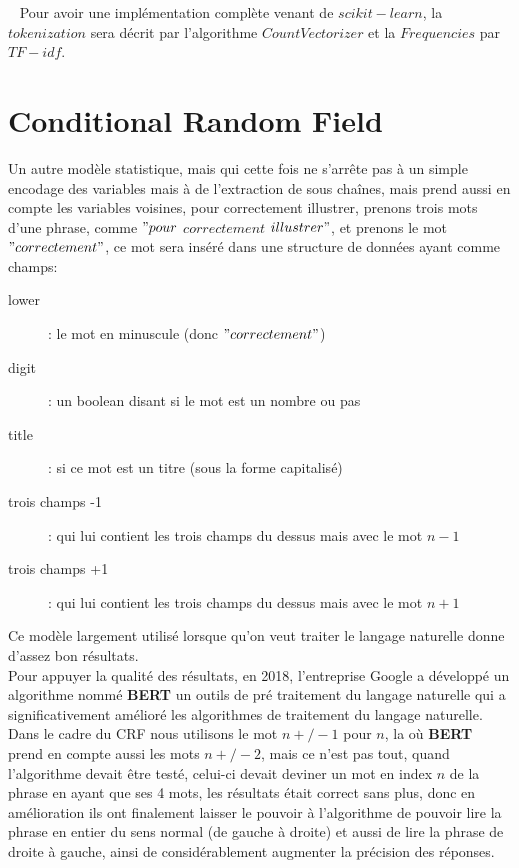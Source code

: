 \ \linebreak
Pour avoir une implémentation complète venant de $scikit-learn$, la $tokenization$ sera décrit par l'algorithme $CountVectorizer$ et la $Frequencies$ par $TF-idf$.\\
\pagebreak

\section{Conditional Random Field}
Un autre modèle statistique, mais qui cette fois ne s'arrête pas à un simple encodage des variables mais à de l'extraction de sous chaînes, mais prend aussi en compte les variables voisines, pour correctement illustrer, prenons trois mots d'une phrase, comme $"pour$ $correctement$ $illustrer"$, et prenons le mot $"correctement"$, ce mot sera inséré dans une structure de données ayant comme champs:
\begin{description}
\item[lower]: le mot en minuscule (donc $"correctement"$)
\item[digit]: un boolean disant si le mot est un nombre ou pas
\item[title]: si ce mot est un titre (sous la forme capitalisé)
\item[trois champs -1]: qui lui contient les trois champs du dessus mais avec le mot $n-1$ 
\item[trois champs +1]: qui lui contient les trois champs du dessus mais avec le mot $n+1$ 
\end{description}

Ce modèle largement utilisé lorsque qu'on veut traiter le langage naturelle donne d'assez bon résultats.\\
\linebreak
Pour appuyer la qualité des résultats, en 2018, l'entreprise Google a développé un algorithme nommé \textbf{BERT} un outils de pré traitement du langage naturelle qui a significativement amélioré les algorithmes de traitement du langage naturelle. Dans le cadre du CRF nous utilisons le mot $n+/-1$ pour $n$, la où \textbf{BERT} prend en compte aussi les mots $n+/-2$, mais ce n'est pas tout, quand l'algorithme devait être testé, celui-ci devait deviner un mot en index $n$ de la phrase en ayant que ses 4 mots, les résultats était correct sans plus, donc en amélioration ils ont finalement laisser le pouvoir à l'algorithme de pouvoir lire la phrase en entier du sens normal (de gauche à droite) et aussi de lire la phrase de droite à gauche, ainsi de considérablement augmenter la précision des réponses.

